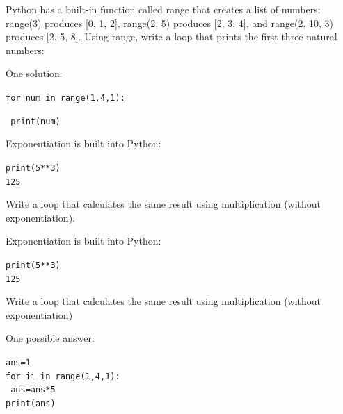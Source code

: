 \documentclass{beamer}
\begin{document}

\begin{frame}{ }

Python has a built-in function called range that creates a list of numbers: range(3) produces [0, 1, 2], range(2, 5) produces [2, 3, 4], and range(2, 10, 3) produces [2, 5, 8]. Using range, write a loop that prints the first three natural numbers:

\vspace{0.5cm}

\alert{One solution:}

\texttt{for num in range(1,4,1):}

\texttt{      print(num)}


\end{frame}



\begin{frame}{ }

Exponentiation is built into Python:

\vspace{0.5cm}

\begin{beamerboxesrounded}[upper=uppercolgreen,lower=lowercolgreen,shadow=false]{}

\texttt{print(5**3)\\
125}
\end{beamerboxesrounded}

\vspace{0.5cm}

Write a loop that calculates the same result using multiplication (without exponentiation).
\end{frame}


\begin{frame}{ }

Exponentiation is built into Python:

\vspace{0.5cm}

\begin{beamerboxesrounded}[upper=uppercolgreen,lower=lowercolgreen,shadow=false]{}

\texttt{print(5**3)\\
125}
\end{beamerboxesrounded}

\vspace{0.5cm}

Write a loop that calculates the same result using multiplication (without exponentiation)

\alert{One possible answer:}

\texttt{ans=1}\\
\texttt{for ii in range(1,4,1):}\\
\texttt{      ans=ans*5}\\
\texttt{print(ans)}

\end{frame}
\end{document}
